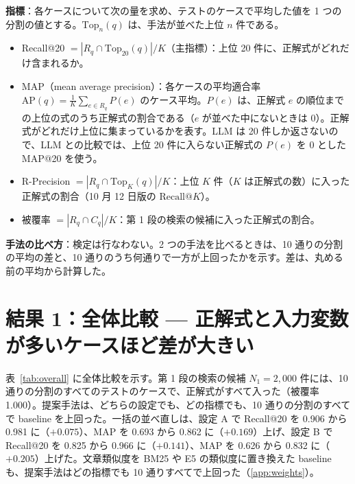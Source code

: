 \documentclass[11pt,a4paper]{ltjsarticle}
\makeatletter
\newcommand{\rk}{\textrm{Recall@}K}
\makeatother
\begin{document}
\textbf{指標}：各ケースについて次の量を求め、テストのケースで平均した値を 1 つの分割の値とする。$\mathrm{Top}_n(q)$ は、手法が並べた上位 $n$ 件である。
\begin{itemize}[leftmargin=1.5em]
  \item Recall@20 $= |R_q \cap \mathrm{Top}_{20}(q)| / K$（主指標）：上位 20 件に、正解式がどれだけ含まれるか。
  \item MAP（mean average precision）：各ケースの平均適合率 $\mathrm{AP}(q) = \frac{1}{K} \sum_{e \in R_q} P(e)$ のケース平均。$P(e)$ は、正解式 $e$ の順位までの上位の式のうち正解式の割合である（$e$ が並べた中にないときは 0）。正解式がどれだけ上位に集まっているかを表す。LLM は 20 件しか返さないので、LLM との比較では、上位 20 件に入らない正解式の $P(e)$ を 0 とした MAP@20 を使う。
  \item R-Precision $= |R_q \cap \mathrm{Top}_K(q)| / K$：上位 $K$ 件（$K$ は正解式の数）に入った正解式の割合（10 月 12 日版の $\rk$）。
  \item 被覆率 $= |R_q \cap C_q| / K$：第 1 段の検索の候補に入った正解式の割合。
\end{itemize}

\textbf{手法の比べ方}：検定は行なわない。2 つの手法を比べるときは、10 通りの分割の平均の差と、10 通りのうち何通りで一方が上回ったかを示す。差は、丸める前の平均から計算した。

\section{結果 1：全体比較 --- 正解式と入力変数が多いケースほど差が大きい}\label{sec:overall}
表~\ref{tab:overall} に全体比較を示す。第 1 段の検索の候補 $N_1 = 2{,}000$ 件には、10 通りの分割のすべてのテストのケースで、正解式がすべて入った（被覆率 1.000）。提案手法は、どちらの設定でも、どの指標でも、10 通りの分割のすべてで baseline を上回った。一括の並べ直しは、設定 A で Recall@20 を 0.906 から 0.981 に（$+0.075$）、MAP を 0.693 から 0.862 に（$+0.169$）上げ、設定 B で Recall@20 を 0.825 から 0.966 に（$+0.141$）、MAP を 0.626 から 0.832 に（$+0.205$）上げた。文章類似度を BM25 や E5 の類似度に置き換えた baseline も、提案手法はどの指標でも 10 通りすべてで上回った（\ref{app:weights}）。
\end{document}
